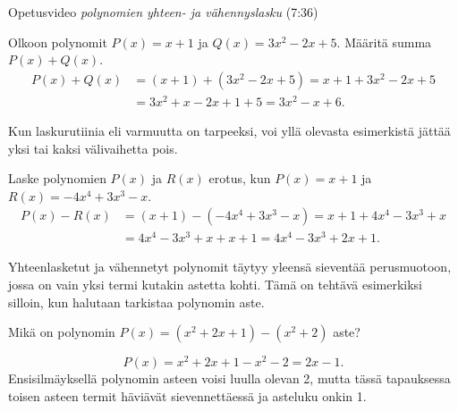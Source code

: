 {Opetusvideo \emph{polynomien yhteen- ja vähennyslasku} (7:36)}
   
\begin{esimerkki}
Olkoon polynomit $P(x)=x+1$ ja $Q(x)=3x^2-2x+5$. Määritä summa $P(x)+Q(x)$.
   \begin{align*}
        P(x)+Q(x)&=(x+1)+(3x^2-2x+5) = x+1+3x^2-2x+5 \\
                 &= 3x^2+x-2x+1+5 =3x^2-x+6.
    \end{align*}
\end{esimerkki}

Kun laskurutiinia eli varmuutta on tarpeeksi, voi yllä olevasta esimerkistä jättää yksi tai kaksi välivaihetta pois.


\begin{esimerkki}
    Laske polynomien $P(x)$ ja $R(x)$ erotus, kun $P(x)=x+1$ ja $R(x)=-4x^4+3x^3-x$.
   \begin{align*}
        P(x)-R(x) & =(x+1)-(-4x^4+3x^3-x) =x+1+4x^4-3x^3+x \\
        & =4x^4-3x^3+x+x+1 = 4x^4-3x^3+2x+1.
    \end{align*}
\end{esimerkki}

Yhteenlasketut ja vähennetyt polynomit täytyy yleensä sieventää perusmuotoon, jossa on vain yksi termi kutakin astetta kohti. Tämä on tehtävä esimerkiksi silloin, kun halutaan tarkistaa polynomin aste.

\begin{esimerkki} Mikä on polynomin $P(x)=(x^2+2x+1)-(x^2+2)$ aste?

\[
P(x)=x^2+2x+1-x^2-2=2x-1.
\]
Ensisilmäyksellä polynomin asteen voisi luulla olevan 2, mutta tässä tapauksessa toisen asteen termit häviävät sievennettäessä ja asteluku onkin 1.
\end{esimerkki}
